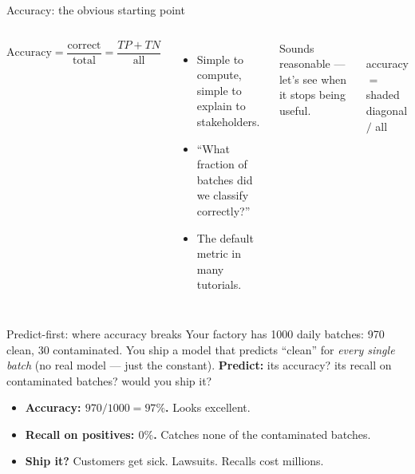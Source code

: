 \documentclass[aspectratio=169]{beamer}
\newcommand{\cmcells}{%
  \draw (0,0) grid (2,2);
  \node at (0.5,1.5){TP}; \node at (1.5,1.5){FN};
  \node at (0.5,0.5){FP}; \node at (1.5,0.5){TN};}
\begin{document}
\begin{frame}{Accuracy: the obvious starting point}
  \begin{columns}[T]
    \[ \text{Accuracy} = \frac{\text{correct}}{\text{total}} = \frac{TP+TN}{\text{all}} \]
    \begin{itemize}\small
      \item Simple to compute, simple to explain to stakeholders.
      \item ``What fraction of batches did we classify correctly?''
      \item The default metric in many tutorials.
    \end{itemize}
    \vskip 4pt
    \footnotesize Sounds reasonable --- let's see when it stops being useful.
    \begin{center}
      \\[2pt]
      \scriptsize accuracy $=$ \textcolor{paramgreen!60!black}{shaded diagonal} $/$ all
    \end{center}
  \end{columns}
\end{frame}

\begin{frame}{Predict-first: where accuracy breaks}
  Your factory has 1000 daily batches: 970 clean, 30 contaminated. You ship a model that
  predicts ``clean'' for \emph{every single batch} (no real model --- just the constant).
  \vfill
  \textbf{Predict:} its accuracy? its recall on contaminated batches? would you ship it?
  \vfill
  \begin{itemize}
    \item \textbf{Accuracy: $970/1000 = 97\%$.} Looks excellent.
    \item \textbf{Recall on positives: $0\%$.} Catches none of the contaminated batches.
    \item \textbf{Ship it?} Customers get sick. Lawsuits. Recalls cost millions.
  \end{itemize}
  \vfill
\end{frame}
\end{document}
